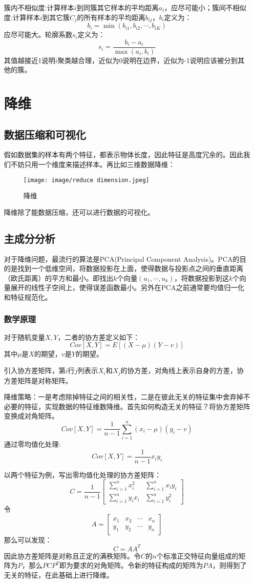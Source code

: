 \documentclass[cn,hazy,blue,normal,14pt]{elegantnote}
\begin{document}
簇内不相似度:计算样本$i$到同簇其它样本的平均距离$a_i$，应尽可能小；簇间不相似度:计算样本$i$到其它簇$C_j$的所有样本的平均距离$b_{ij}$，$b_i$定义为：
$$
b_i=\min (b_{i1},b_{i2},\cdots,b_{iK})
$$
应尽可能大。轮廓系数$s_i$定义为：
$$
s_i=\frac{b_i-a_i}{\max(a_i,b_i)}
$$
其值越接近1说明$i$聚类越合理，近似为0说明在边界，近似为-1说明应该被分到其他的簇。
\section{降维}
\subsection{数据压缩和可视化}
假如数据集的样本有两个特征，都表示物体长度，因此特征是高度冗余的。因此我们不妨只用一个维度来描述样本。再比如三维数据降维：
\begin{figure}[H]
    \centering
    \texttt{[image: image/reduce dimension.jpeg]}
    \caption{降维}
\end{figure}

降维除了能数据压缩，还可以进行数据的可视化。
\subsection{主成分分析}
对于降维问题，最流行的算法是PCA(Principal Component Analysis)。PCA的目的是找到一个低维空间，将数据投影在上面，使得数据与投影点之间的垂直距离（欧氏距离）的平方和最小。即找出$k$个向量$(u_1,\cdots,u_k)$，将数据投影到这$k$个向量展开的线性子空间上，使得误差函数最小。另外在PCA之前通常要均值归一化和特征规范化。

\subsubsection{数学原理}
\begin{definition}[协方差]
对于随机变量$X,Y$，二者的协方差定义如下：
$$
Cov[X,Y]=E[(X-\mu)(Y-v)]
$$
其中$\mu$是$X$的期望，$v$是$Y$的期望。
\end{definition}
引入协方差矩阵，第$i$行$j$列表示$X_i$和$X_j$的协方差，对角线上表示自身的方差，协方差矩阵是对称矩阵。

降维策略：一是考虑除掉特征之间的相关性，二是在彼此无关的特征集中舍弃掉不必要的特征，实现数据的特征维数降维。首先如何构造无关的特征？将协方差矩阵变换成对角矩阵。
$$
Cov[X,Y]=\frac{1}{n-1}\sum_{i=1}^n (x_i-\mu)(y_i-v)
$$
通过零均值化处理:
$$
Cov[X,Y]=\frac{1}{n-1}x_iy_i
$$

以两个特征为例，写出零均值化处理的协方差矩阵：
$$
C=\frac{1}{n-1}\begin{bmatrix}
    \sum\limits_{i=1}^n x_i^2 & \sum\limits_{i=1}^n x_iy_i  \\
    \sum\limits_{i=1}^n y_ix_i & \sum\limits_{i=1}^n y_i^2
\end{bmatrix}
$$
令
$$
A=\begin{bmatrix}
    x_1 &x_2 &\cdots &x_n \\
    y_1 &y_2 &\cdots &y_n
\end{bmatrix}
$$
那么可以发现：
$$
C=AA^T
$$
因此协方差矩阵是对称且正定的满秩矩阵。令$C$的$n$个标准正交特征向量组成的矩阵为$P$，那么$PCP^T$即为要求的对角矩阵。令新的特征构成的矩阵为$PA$，则得到了无关的特征，在此基础上进行降维。
\end{document}
